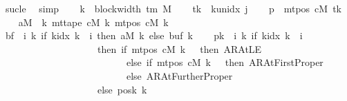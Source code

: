 \begin{isabellebody}
\ sucle\ \isamarkupfalse%
\ simp\isanewline
\ \ \isamarkupfalse%
\ {\isacharquery}{\kern0pt}k\ {\isacharequal}{\kern0pt}\ {\isachardoublequoteopen}block{\isacharunderscore}{\kern0pt}width\ {\isacharparenleft}{\kern0pt}{\isasymGamma}{\isacharunderscore}{\kern0pt}tm\ M{\isacharparenright}{\kern0pt}{\isachardoublequoteclose}\isanewline
\ \ \isamarkupfalse%
\ {\isacharquery}{\kern0pt}tk\ {\isacharequal}{\kern0pt}\ {\isachardoublequoteopen}k{\isacharunderscore}{\kern0pt}unidx\ j{\isachardoublequoteclose}\isanewline
\ \ \isamarkupfalse%
\ {\isacharquery}{\kern0pt}p\ {\isacharequal}{\kern0pt}\ {\isachardoublequoteopen}mt{\isacharunderscore}{\kern0pt}pos\ cM\ {\isacharquery}{\kern0pt}tk{\isachardoublequoteclose}\isanewline
\ \ \isamarkupfalse%
\ {\isacharquery}{\kern0pt}aM\ {\isacharequal}{\kern0pt}\ {\isachardoublequoteopen}{\isasymlambda}k{\isachardot}{\kern0pt}\ mt{\isacharunderscore}{\kern0pt}tape\ cM\ k\ {\isacharparenleft}{\kern0pt}mt{\isacharunderscore}{\kern0pt}pos\ cM\ k{\isacharparenright}{\kern0pt}{\isachardoublequoteclose}\isanewline
\ \ \isamarkupfalse%
\ {\isacharquery}{\kern0pt}bf\ {\isacharequal}{\kern0pt}\ {\isachardoublequoteopen}{\isasymlambda}i{\isachardot}{\kern0pt}\ {\isacharparenleft}{\kern0pt}{\isasymlambda}k{\isachardot}{\kern0pt}\ if\ k{\isacharunderscore}{\kern0pt}idx\ k\ {\isacharless}{\kern0pt}\ i\ then\ {\isacharquery}{\kern0pt}aM\ k\ else\ buf{}\ k{\isacharparenright}{\kern0pt}{\isachardoublequoteclose}\isanewline
\ \ \isamarkupfalse%
\ {\isacharquery}{\kern0pt}pk\ {\isacharequal}{\kern0pt}\ {\isachardoublequoteopen}{\isasymlambda}i{\isachardot}{\kern0pt}\ {\isacharparenleft}{\kern0pt}{\isasymlambda}k{\isachardot}{\kern0pt}\ if\ k{\isacharunderscore}{\kern0pt}idx\ k\ {\isacharless}{\kern0pt}\ i\isanewline
\ \ \ \ \ \ \ \ \ \ \ \ \ \ \ \ \ \ \ \ then\ {\isacharparenleft}{\kern0pt}if\ mt{\isacharunderscore}{\kern0pt}pos\ cM\ k\ {\isacharequal}{\kern0pt}\ {}\ then\ AR{\isacharunderscore}{\kern0pt}AtLE\isanewline
\ \ \ \ \ \ \ \ \ \ \ \ \ \ \ \ \ \ \ \ \ \ \ \ \ \ else\ if\ mt{\isacharunderscore}{\kern0pt}pos\ cM\ k\ {\isacharequal}{\kern0pt}\ {}\ then\ AR{\isacharunderscore}{\kern0pt}AtFirstProper\isanewline
\ \ \ \ \ \ \ \ \ \ \ \ \ \ \ \ \ \ \ \ \ \ \ \ \ \ else\ AR{\isacharunderscore}{\kern0pt}AtFurtherProper{\isacharparenright}{\kern0pt}\isanewline
\ \ \ \ \ \ \ \ \ \ \ \ \ \ \ \ \ \ \ \ else\ posk{}\ k{\isacharparenright}{\kern0pt}{\isachardoublequoteclose}\isanewline

\end{isabellebody}
